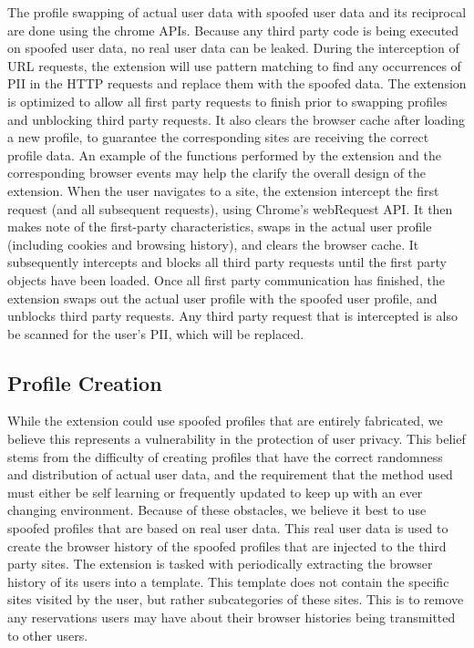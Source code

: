 \documentclass[11pt,twocolumn]{article}
\begin{document}
The profile swapping of actual user data with spoofed user data and its reciprocal are done using the chrome APIs. Because any third party code is being executed on spoofed user data, no real user data can be leaked. During the interception of URL requests, the extension will use pattern matching to find any occurrences of PII in the HTTP requests and replace them with the spoofed data. The extension is optimized to allow all first party requests to finish prior to swapping profiles and unblocking third party requests. It also clears the browser cache after loading a new profile, to guarantee the corresponding sites are receiving the correct profile data. An example of the functions performed by the extension and the corresponding browser events may help the clarify the overall design of the extension. When the user navigates to a site, the extension intercept the first request (and all subsequent requests), using Chrome's webRequest API. It then makes note of the first-party characteristics, swaps in the actual user profile (including cookies and browsing history), and clears the browser cache. It subsequently intercepts and blocks all third party requests until the first party objects have been loaded. Once all first party communication has finished, the extension swaps out the actual user profile with the spoofed user profile, and unblocks third party requests. Any third party request that is intercepted is also be scanned for the user's PII, which will be replaced.

\subsection{Profile Creation}
While the extension could use spoofed profiles that are entirely fabricated, we believe this represents a vulnerability in the protection of user privacy. This belief stems from the difficulty of creating profiles that have the correct randomness and distribution of actual user data, and the requirement that the method used must either be self learning or frequently updated to keep up with an ever changing environment. Because of these obstacles, we believe it best to use spoofed profiles that are based on real user data. This real user data is used to create the browser history of the spoofed profiles that are injected to the third party sites. The extension is tasked with periodically extracting the browser history of its users into a template. This template does not contain the specific sites visited by the user, but rather subcategories of these sites. This is to remove any reservations users may have about their browser histories being transmitted to other users.
\end{document}

